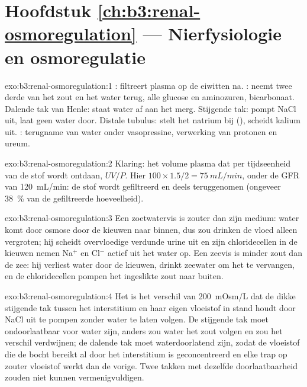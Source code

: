 \section*{Hoofdstuk \ref{ch:b3:renal-osmoregulation} --- Nierfysiologie en osmoregulatie}

\begin{solution}{exo:b3:renal-osmoregulation:1}
: filtreert plasma op de eiwitten na. :
neemt twee derde van het zout en het water terug, alle glucose en
aminozuren, bicarbonaat. Dalende tak van Henle: staat water af aan het
merg. Stijgende tak: pompt NaCl uit, laat geen water door. Distale
tubulus: stelt het natrium bij (), scheidt kalium uit.
: terugname van water onder vasopressine, verwerking van
protonen en ureum.
\end{solution}

\begin{solution}{exo:b3:renal-osmoregulation:2}
Klaring: het volume plasma dat per tijdseenheid van de stof wordt
ontdaan, $UV/P$. Hier $100\times 1.5/2 = \qty{75}{mL/min}$, onder de
GFR van \qty{120}{mL/min}: de stof wordt gefiltreerd en deels
teruggenomen (ongeveer \qty{38}{\%} van de gefiltreerde hoeveelheid).
\end{solution}

\begin{solution}{exo:b3:renal-osmoregulation:3}
Een zoetwatervis is zouter dan zijn medium: water komt door osmose door
de kieuwen naar binnen, dus zou drinken de vloed alleen vergroten; hij
scheidt overvloedige verdunde urine uit en zijn chloridecellen in de
kieuwen nemen Na$^{+}$ en Cl$^{-}$ actief uit het water op. Een zeevis
is minder zout dan de zee: hij verliest water door de kieuwen, drinkt
zeewater om het te vervangen, en de chloridecellen pompen het
ingeslikte zout naar buiten.
\end{solution}

\begin{solution}{exo:b3:renal-osmoregulation:4}
Het  is het verschil van \qty{200}{mOsm/L} dat de
dikke stijgende tak tussen het interstitium en haar eigen vloeistof in
stand houdt door NaCl uit te pompen zonder water te laten volgen. De
stijgende tak moet ondoorlaatbaar voor water zijn, anders zou water het
zout volgen en zou het verschil verdwijnen; de dalende tak moet
waterdoorlatend zijn, zodat de vloeistof die de bocht bereikt al door
het interstitium is geconcentreerd en elke trap op zouter vloeistof
werkt dan de vorige. Twee takken met dezelfde doorlaatbaarheid zouden
niet kunnen vermenigvuldigen.
\end{solution}

